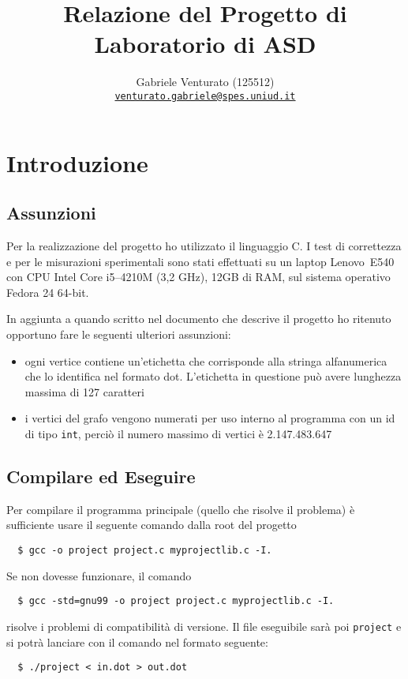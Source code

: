\documentclass[a4paper,8pt]{article}
\newcommand{\mail}[1]{\href{mailto:#1}{\texttt{#1}}}
\theoremstyle{definition}
\theoremstyle{remark}
\begin{document}
\author{Gabriele Venturato (125512)\\\mail{venturato.gabriele@spes.uniud.it}}
\title{Relazione del Progetto di Laboratorio di ASD}{}
\docdate{}
\maketitle

\tableofcontents
\newpage


\section{Introduzione}
\subsection{Assunzioni}
Per la realizzazione del progetto ho utilizzato il linguaggio C. I test di
correttezza e per le misurazioni sperimentali sono stati effettuati su un
laptop \mbox{Lenovo~E540} con CPU Intel Core i5--4210M (3,2 GHz), 12GB di RAM,
sul sistema operativo Fedora 24 64-bit.

In aggiunta a quando scritto nel documento che descrive il progetto ho ritenuto
opportuno fare le seguenti ulteriori assunzioni:
\begin{itemize}
  \item ogni vertice contiene un'etichetta che corrisponde alla stringa alfanumerica
    che lo identifica nel formato dot. L'etichetta in questione può avere lunghezza
    massima di 127 caratteri
  \item i vertici del grafo vengono numerati per uso interno al programma con un
    id di tipo \texttt{int}, perciò il numero massimo di vertici è 2.147.483.647
\end{itemize}

\subsection{Compilare ed Eseguire}
Per compilare il programma principale (quello che risolve il problema) è sufficiente
usare il seguente comando dalla root del progetto
\begin{verbatim}
  $ gcc -o project project.c myprojectlib.c -I.
\end{verbatim}
Se non dovesse funzionare, il comando
\begin{verbatim}
  $ gcc -std=gnu99 -o project project.c myprojectlib.c -I.
\end{verbatim}
risolve i problemi di compatibilità di versione. Il file eseguibile sarà poi
\verb!project! e si potrà lanciare con il comando nel formato seguente:
\begin{verbatim}
  $ ./project < in.dot > out.dot
\end{verbatim}
\end{document}
